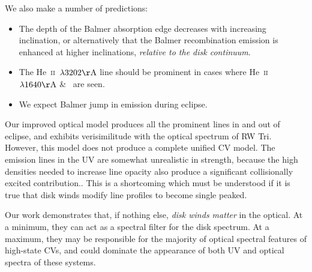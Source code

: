\documentclass[preprint, a4paper, 11pt]{aastex}
\begin{document}
\noindent We also make a number of predictions:

\begin{itemize}
	\item The depth of the Balmer absorption edge decreases with increasing inclination,
or alternatively that the Balmer recombination emission
is enhanced at higher inclinations, {\sl relative to the disk continuum}.
	\item The He~\textsc{ii}~$\lambda3202{\rm \AA}$ line should be
prominent in cases where He~\textsc{ii}~$\lambda1640{\rm \AA}$ \& 
\heiiopt\ are seen. 
	\item We expect Balmer jump in emission during eclipse.
\end{itemize}

\smallskip
Our improved optical model produces all the prominent lines in and out of eclipse, and
exhibits verisimilitude with the optical spectrum of RW Tri.
However, this model does not produce a complete unified CV model. 
The emission lines in the UV are somewhat unrealistic in strength,
because the high densities needed to increase line opacity also produce
a significant collisionally excited contribution..
This is a shortcoming which must be understood if it is true that
disk winds modify line profiles to become single peaked.

Our work demonstrates that, if nothing else,
{\sl disk winds matter} in the optical. At a minimum,
they can act as a spectral filter
for the disk spectrum.
At a maximum, they may be responsible
for the majority of optical spectral features of high-state CVs,
and could dominate the appearance of both UV and optical
spectra of these systems.







\end{document}
